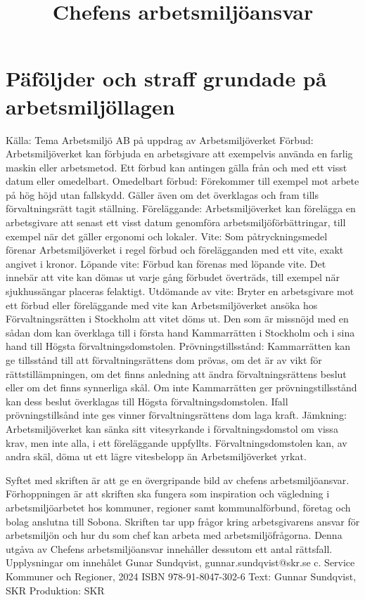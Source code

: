 \section*{Päföljder och straff grundade på arbetsmiljöllagen}
Källa: Tema Arbetsmiljö AB på uppdrag av Arbetsmiljöverket
Förbud: Arbetsmiljöverket kan förbjuda en arbetsgivare att exempelvis använda en farlig maskin eller arbetsmetod. Ett förbud kan antingen gälla från och med ett visst datum eller omedelbart.
Omedelbart förbud: Förekommer till exempel mot arbete på hög höjd utan fallskydd. Gäller även om det överklagas och fram tills förvaltningsrätt tagit ställning.
Föreläggande: Arbetsmiljöverket kan förelägga en arbetsgivare att senast ett visst datum genomföra arbetsmiljöförbättringar, till exempel när det gäller ergonomi och lokaler.
Vite: Som påtryckningsmedel förenar Arbetsmiljöverket i regel förbud och förelägganden med ett vite, exakt angivet i kronor.
Löpande vite: Förbud kan förenas med löpande vite. Det innebär att vite kan dömas ut varje gång förbudet överträds, till exempel när sjukhussängar placeras felaktigt.
Utdömande av vite: Bryter en arbetsgivare mot ett förbud eller föreläggande med vite kan Arbetsmiljöverket ansöka hos Förvaltningsrätten i Stockholm att vitet döms ut. Den som är missnöjd med en sådan dom kan överklaga till i första hand Kammarrätten i Stockholm och i sina hand till Högsta förvaltningsdomstolen.
Prövningstillsstånd: Kammarrätten kan ge tillsstånd till att förvaltningsrättens dom prövas, om det är av vikt för rättstillämpningen, om det finns anledning att ändra förvaltningsrättens beslut eller om det finns synnerliga skål. Om inte Kammarrätten ger prövningstillsstånd kan dess beslut överklagas till Högsta förvaltningsdomstolen. Ifall prövningstillsånd inte ges vinner förvaltningsrättens dom laga kraft.
Jämkning: Arbetsmiljöverket kan sänka sitt vitesyrkande i förvaltningsdomstol om vissa krav, men inte alla, i ett föreläggande uppfyllts. Förvaltningsdomstolen kan, av andra skäl, döma ut ett lägre vitesbelopp än Arbetsmiljöverket yrkat.

\title{
Chefens arbetsmiljöansvar
}
Syftet med skriften är att ge en övergripande bild av chefens arbetsmiljöansvar. Förhoppningen är att skriften ska fungera som inspiration och vägledning i arbetsmiljöarbetet hos kommuner, regioner samt kommunalförbund, företag och bolag anslutna till Sobona. Skriften tar upp frågor kring arbetsgivarens ansvar för arbetsmiljön och hur du som chef kan arbeta med arbetsmiljöfrågorna. Denna utgåva av Chefens arbetsmiljöansvar innehåller dessutom ett antal rättsfall.
Upplysningar om innehålet
Gunar Sundqvist, gunnar.sundqvist@skr.se
c. Service Kommuner och Regioner, 2024
ISBN 978-91-8047-302-6
Text: Gunnar Sundqvist, SKR
Produktion: SKR